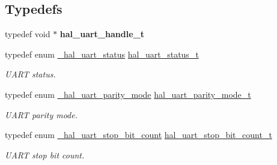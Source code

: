 \subsection*{Typedefs}
\begin{DoxyCompactItemize}
\item 
\mbox{\label{group___u_a_r_t___adapter_gae4e2bad20cdbd350adfa29a03102a2dc}} 
typedef void $\ast$ {\bfseries hal\+\_\+uart\+\_\+handle\+\_\+t}
\item 
\mbox{\label{group___u_a_r_t___adapter_ga352ee9bdc398eba4262ca7656f9c5e50}} 
typedef enum \mbox{\hyperlink{group___u_a_r_t___adapter_gaaaffa428b5b9f79a5e510eb34c74f8f6}{\+\_\+hal\+\_\+uart\+\_\+status}} \mbox{\hyperlink{group___u_a_r_t___adapter_ga352ee9bdc398eba4262ca7656f9c5e50}{hal\+\_\+uart\+\_\+status\+\_\+t}}
\begin{DoxyCompactList}\small\item\em U\+A\+RT status. \end{DoxyCompactList}\item 
\mbox{\label{group___u_a_r_t___adapter_ga24029165f252c4fe925cdb8af52b3b8f}} 
typedef enum \mbox{\hyperlink{group___u_a_r_t___adapter_ga4bfc5f54ba1569ae2dfcc1d7ae0be0f3}{\+\_\+hal\+\_\+uart\+\_\+parity\+\_\+mode}} \mbox{\hyperlink{group___u_a_r_t___adapter_ga24029165f252c4fe925cdb8af52b3b8f}{hal\+\_\+uart\+\_\+parity\+\_\+mode\+\_\+t}}
\begin{DoxyCompactList}\small\item\em U\+A\+RT parity mode. \end{DoxyCompactList}\item 
\mbox{\label{group___u_a_r_t___adapter_gad0fc800e49978f5aee5c162009b16bdb}} 
typedef enum \mbox{\hyperlink{group___u_a_r_t___adapter_gac8e83321127267d2bed1659d4227f050}{\+\_\+hal\+\_\+uart\+\_\+stop\+\_\+bit\+\_\+count}} \mbox{\hyperlink{group___u_a_r_t___adapter_gad0fc800e49978f5aee5c162009b16bdb}{hal\+\_\+uart\+\_\+stop\+\_\+bit\+\_\+count\+\_\+t}}
\begin{DoxyCompactList}\small\item\em U\+A\+RT stop bit count. \end{DoxyCompactList}\item 
\mbox{\label{group___u_a_r_t___adapter_ga1545cbd3c961cbe725ed2a75ffc5a999}} 

\end{DoxyCompactItemize}
